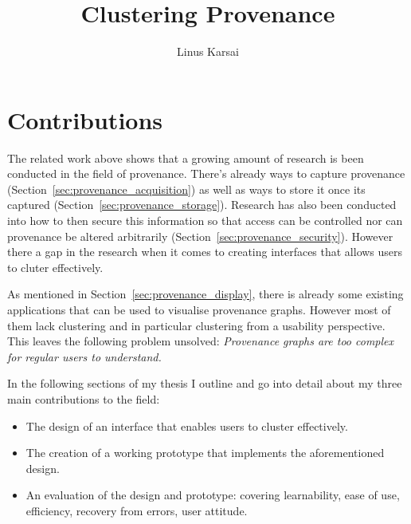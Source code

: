 \documentclass[BIT, graphvis, a4paper]{usydthesis}
\title{Clustering Provenance}
\begin{document}
\author{Linus Karsai}

\maketitle
\tableofcontents
\newpage\setcounter{page}{1}




\section{Contributions}

The related work above shows that a growing amount of research is been conducted in the field of provenance. There's already ways to capture provenance (Section~\ref{sec:provenance_acquisition}) as well as ways to store it once its captured (Section~\ref{sec:provenance_storage}). Research has also been conducted into how to then secure this information so that access can be controlled nor can provenance be altered arbitrarily (Section~\ref{sec:provenance_security}). However there a gap in the research when it comes to creating interfaces that allows users to cluter effectively.

As mentioned in Section~\ref{sec:provenance_display}, there is already some existing applications that can be used to visualise provenance graphs. However most of them lack clustering and in particular clustering from a usability perspective. This leaves the following problem unsolved: \textit{Provenance graphs are too complex for regular users to understand.} 

In the following sections of my thesis I outline and go into detail about my three main contributions to the field:

\begin{itemize}
	\item The design of an interface that enables users to cluster effectively.
	\item The creation of a working prototype that implements the aforementioned design.
	\item An evaluation of the design and prototype: covering learnability, ease of use, efficiency, recovery from errors, user attitude.
\end{itemize}
\end{document}
